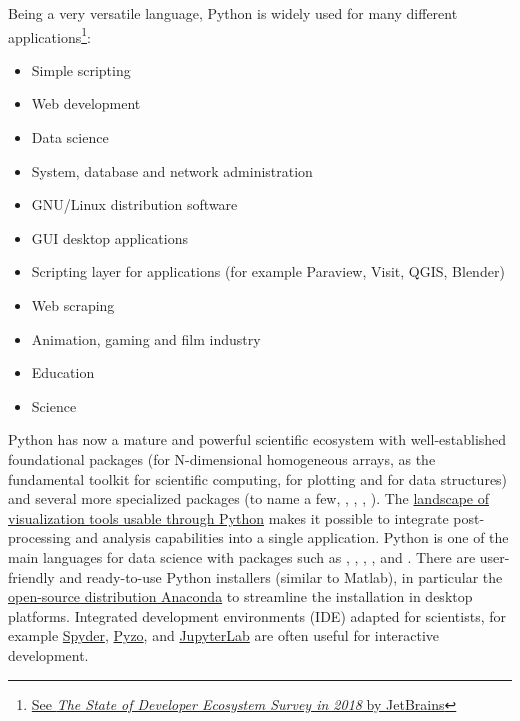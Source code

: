 Being a very versatile language, Python is widely used for many different
applications\footnote{\href{https://www.jetbrains.com/research/devecosystem-2018/python/}{See
\emph{The State of Developer Ecosystem Survey in 2018} by JetBrains}}:

\begin{itemize}
\item Simple scripting

\item Web development

\item Data science

\item System, database and network administration

\item GNU/Linux distribution software

\item GUI desktop applications

\item Scripting layer for applications (for example Paraview, Visit, QGIS,
	Blender)

\item Web scraping

\item Animation, gaming and film industry

\item Education

\item Science

\end{itemize}
%
Python
has now a mature and powerful scientific ecosystem with well-established
foundational packages
%
(\Numpy for N-dimensional homogeneous arrays, \Scipy as the
fundamental toolkit for scientific computing,  for plotting
and  for data structures) and several more specialized packages
(to name a few, , , , ).
The \href{https://github.com/rougier/python-visualization-landscape}{%
landscape of visualization tools usable through Python} makes it possible to
integrate post-processing and analysis capabilities into a single application.
%
Python is one of the main languages for data science with packages such as
, , , ,
 and .
%
There are user-friendly and ready-to-use Python installers (similar to Matlab), in
particular the
\href{https://en.wikipedia.org/wiki/Anaconda_(Python_distribution)}{%
open-source distribution Anaconda} to streamline the installation in
desktop platforms.
Integrated development environments (IDE) adapted for
scientists, for example \href{https://github.com/spyder-ide/spyder}{Spyder},
\href{https://pyzo.org}{Pyzo},
and \href{https://jupyterlab.readthedocs.io}{JupyterLab} are often useful for
interactive development.

